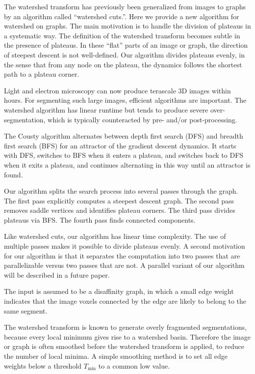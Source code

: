 \documentclass{article}\usepackage{times}
\begin{document}
The watershed transform has previously been generalized from images to
graphs by an algorithm called ``watershed
cuts.''\cite{Cousty2009,Cousty2010}.  Here we provide a new algorithm
for watershed on graphs.  The main motivation is to handle the
division of plateaus in a systematic way. The definition of the
watershed transform becomes subtle in the presence of plateaus.  In
these ``flat'' parts of an image or graph, the direction of steepest
descent is not well-defined.  Our algorithm divides plateaus evenly,
in the sense that from any node on the plateau, the dynamics follows
the shortest path to a plateau corner.

Light and electron microscopy can now produce terascale 3D images within hours. For segmenting such large images, efficient algorithms are important. The watershed algorithm has linear runtime but tends to produce severe over-segmentation, which is typically counteracted by pre- and/or post-processing.

The Cousty algorithm alternates between depth first search (DFS) and
breadth first search (BFS) for an attractor of the gradient descent
dynamics.  It starts with DFS, switches to BFS when it enters a
plateau, and switches back to DFS when it exits a plateau, and continues alternating in this way until an attractor is found.

Our algorithm splits the search process into several passes through the graph.  The first pass explicitly computes a steepest descent graph.  The second pass removes saddle vertices and identifies plateau corners. The third pass divides plateaus via BFS. The fourth pass finds connected components.

Like watershed cuts, our algorithm has linear time complexity.
The use of multiple passes makes it possible to divide plateaus
evenly.  A second motivation for our algorithm is that it separates
the computation into two passes that are parallelizable versus two
passes that are not.  A parallel variant of our algorithm will be described in a future paper.

The input is assumed to be a disaffinity graph, in which a small edge weight indicates that the image voxels connected by the edge are likely to belong to the same segment.

The watershed transform is known to generate overly fragmented
segmentations, because every local minimum gives rise to a watershed
basin.  Therefore the image or graph is often smoothed before the
watershed transform is applied, to reduce the number of local minima.
A simple smoothing method is to set all edge weights below a threshold
$T_{\min}$ to a common low value.  
\end{document}
